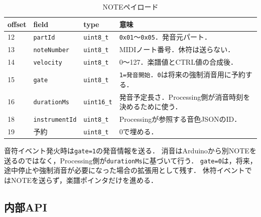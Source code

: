 \documentclass[lualatex,book,paper=a4paper,jafontsize=11.5pt,jafontscale=1.05]{jlreq}
\newcommand{\code}[1]{\texttt{#1}}
\begin{document}
\begin{table}[H]
\centering
\caption{NOTEペイロード}
\label{tab:saito-note-payload}
\begin{tabular}{p{}p{}p{}p{}}
\toprule
\textbf{offset} & \textbf{field} & \textbf{type} & \textbf{意味} \\
\midrule
12 & \code{partId} & \code{uint8\_t} & \code{0x01}〜\code{0x05}．発音元パート．\\
13 & \code{noteNumber} & \code{uint8\_t} & MIDIノート番号．休符は送らない．\\
14 & \code{velocity} & \code{uint8\_t} & 0〜127．楽譜値とCTRL値の合成後．\\
15 & \code{gate} & \code{uint8\_t} & \code{1=発音開始}．\code{0}は将来の強制消音用に予約する．\\
16 & \code{durationMs} & \code{uint16\_t} & 発音予定長さ．Processing側が消音時刻を決めるために使う．\\
18 & \code{instrumentId} & \code{uint8\_t} & Processingが参照する音色JSONのID．\\
19 & 予約 & \code{uint8\_t} & 0で埋める．\\
\bottomrule
\end{tabular}
\end{table}

音符イベント発火時は\code{gate=1}の発音情報を送る．
消音はArduinoから別NOTEを送るのではなく，Processing側が\code{durationMs}に基づいて行う．
\code{gate=0}は，将来，途中停止や強制消音が必要になった場合の拡張用として残す．
休符イベントではNOTEを送らず，楽譜ポインタだけを進める．

\subsection{内部API}
\end{document}
